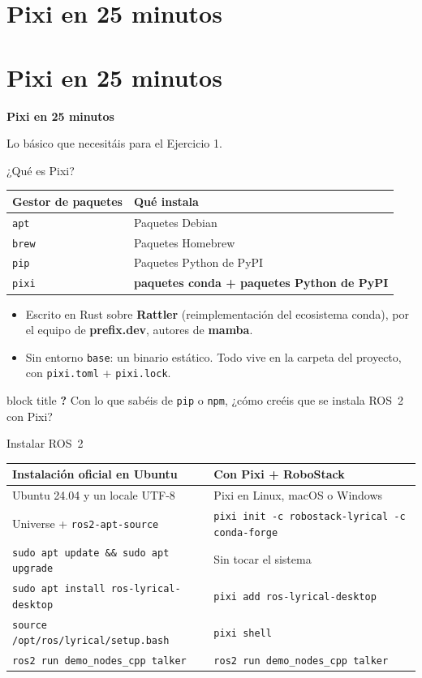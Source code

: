\documentclass[aspectratio=169]{beamer}
\newcommand{\preguntaframe}[1]{%
\begin{frame}
  \begin{center}
  \begin{beamercolorbox}[sep=1em,center]{block title}
  \Large \textbf{?} \; #1
  \end{beamercolorbox}
  \end{center}
\end{frame}%
}
\newcommand{\separador}[2]{%
\begin{frame}
  \centering
  \vfill
  {\usebeamercolor[fg]{structure}\fontsize{34}{40}\selectfont\bfseries #1\par}
  \vspace{1.2em}
  {\Large\color{halfgray} #2\par}
  \vfill
\end{frame}%
}
\newcommand{\seccion}[3][]{%
  \if\relax\detokenize{#1}\relax\section{#2}\else\section[#1]{#2}\fi
  \separador{#2}{#3}%
}
\begin{document}
\seccion[Pixi]{Pixi en 25 minutos}{Lo básico que necesitáis para el Ejercicio 1.}

\begin{frame}{¿Qué es Pixi?}
\centering
\begin{tabular}{ll}
\toprule
\textbf{Gestor de paquetes} & \textbf{Qué instala} \\
\midrule
\texttt{apt} & Paquetes Debian \\
\texttt{brew} & Paquetes Homebrew \\
\texttt{pip} & Paquetes Python de PyPI \\
\texttt{pixi} & \textbf{paquetes conda + paquetes Python de PyPI} \\
\bottomrule
\end{tabular}
\vfill
\begin{itemize}
    \item Escrito en Rust sobre \textbf{Rattler} (reimplementación del ecosistema conda), por el equipo de \textbf{prefix.dev}, autores de \textbf{mamba}.
    \item Sin entorno \texttt{base}: un binario estático. Todo vive en la carpeta del proyecto, con \lstinline|pixi.toml| + \lstinline|pixi.lock|.
\end{itemize}
\end{frame}

\preguntaframe{Con lo que sabéis de \texttt{pip} o \texttt{npm}, ¿cómo creéis que se instala ROS~2 con Pixi?}

\begin{frame}{Instalar ROS~2}
\centering
\scriptsize
\begin{tabular}{ll}
\toprule
\textbf{Instalación oficial en Ubuntu} & \textbf{Con Pixi + RoboStack} \\
\midrule
Ubuntu 24.04 y un locale UTF-8 & Pixi en Linux, macOS o Windows \\
Universe + \texttt{ros2-apt-source} & \texttt{pixi init -c robostack-lyrical -c conda-forge} \\
\texttt{sudo apt update \&\& sudo apt upgrade} & Sin tocar el sistema \\
\texttt{sudo apt install ros-lyrical-desktop} & \texttt{pixi add ros-lyrical-desktop} \\
\texttt{source /opt/ros/lyrical/setup.bash} & \texttt{pixi shell} \\
\texttt{ros2 run demo\_nodes\_cpp talker} & \texttt{ros2 run demo\_nodes\_cpp talker} \\
\bottomrule
\end{tabular}
\end{frame}
\end{document}
